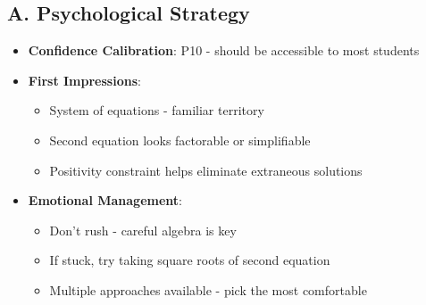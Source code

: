 \documentclass[12pt]{article}
\begin{document}
\begin{strategicbox}
\subsection*{A. Psychological Strategy}
\begin{itemize}[leftmargin=*]
    \item \textbf{Confidence Calibration}: P10 - should be accessible to most students
    \item \textbf{First Impressions}: 
    \begin{itemize}
        \item System of equations - familiar territory
        \item Second equation looks factorable or simplifiable
        \item Positivity constraint helps eliminate extraneous solutions
    \end{itemize}
    \item \textbf{Emotional Management}: 
    \begin{itemize}
        \item Don't rush - careful algebra is key
        \item If stuck, try taking square roots of second equation
        \item Multiple approaches available - pick the most comfortable
    \end{itemize}
\end{itemize}


\end{strategicbox}
\end{document}
